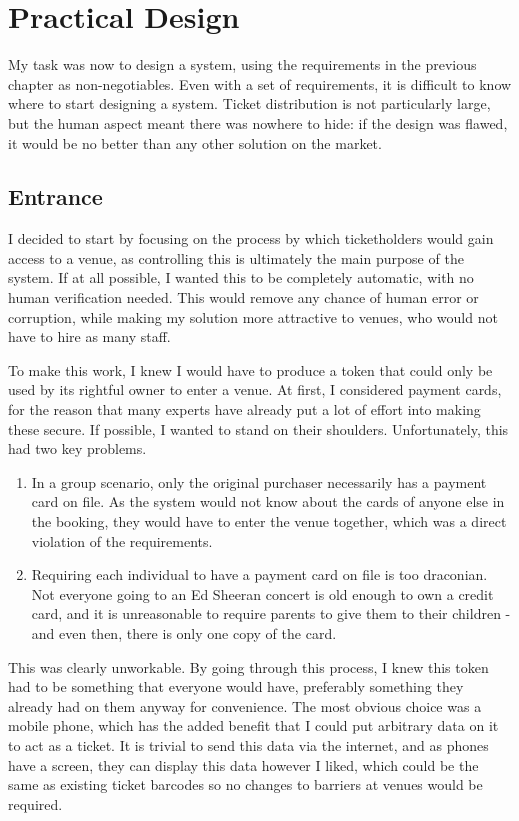 \documentclass[12pt,a4]{bhamdissertation}
\begin{document}
\chapter{Practical Design}

My task was now to design a system, using the requirements in the previous chapter as non-negotiables. Even with a set of requirements, it is difficult to know where to start designing a system. Ticket distribution is not particularly large, but the human aspect meant there was nowhere to hide: if the design was flawed, it would be no better than any other solution on the market.

\section{Entrance}

I decided to start by focusing on the process by which ticketholders would gain access to a venue, as controlling this is ultimately the main purpose of the system. If at all possible, I wanted this to be completely automatic, with no human verification needed. This would remove any chance of human error or corruption, while making my solution more attractive to venues, who would not have to hire as many staff.

To make this work, I knew I would have to produce a token that could only be used by its rightful owner to enter a venue. At first, I considered payment cards, for the reason that many experts have already put a lot of effort into making these secure. If possible, I wanted to stand on their shoulders. Unfortunately, this had two key problems.

\begin{enumerate}
    \item In a group scenario, only the original purchaser necessarily has a payment card on file. As the system would not know about the cards of anyone else in the booking, they would have to enter the venue together, which was a direct violation of the requirements.
    \item Requiring each individual to have a payment card on file is too draconian. Not everyone going to an Ed Sheeran concert is old enough to own a credit card, and it is unreasonable to require parents to give them to their children - and even then, there is only one copy of the card.
\end{enumerate}

This was clearly unworkable. By going through this process, I knew this token had to be something that everyone would have, preferably something they already had on them anyway for convenience. The most obvious choice was a mobile phone, which has the added benefit that I could put arbitrary data on it to act as a ticket. It is trivial to send this data via the internet, and as phones have a screen, they can display this data however I liked, which could be the same as existing ticket barcodes so no changes to barriers at venues would be required.
\end{document}
